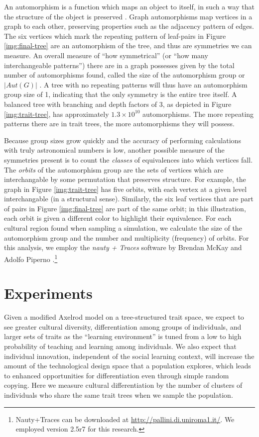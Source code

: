 An automorphism is a function which maps an object to itself, in such a
way that the structure of the object is preserved
\citep{rotman1995introduction}. Graph automorphisms map vertices in a
graph to each other, preserving properties such as the adjacency pattern
of edges. The six vertices which mark the repeating pattern of
leaf-pairs in Figure \ref{img:final-tree} are an automorphism of the
tree, and thus are symmetries we can measure. An overall measure of
``how symmetrical'' (or ``how many interchangeable patterns'') there are
in a graph possesses given by the total number of automorphisms found,
called the size of the automorphism group or $|\textit{Aut}(G)|$
\citep{godsil2001algebraic}. A tree with no repeating patterns will thus
have an automorphism group size of 1, indicating that the only symmetry
is the entire tree itself. A balanced tree with branching and depth
factors of 3, as depicted in Figure \ref{img:trait-tree}, has
approximately $1.3 \times 10^{10}$ automorphisms. The more repeating
patterns there are in trait trees, the more automorphisms they will
possess.

Because group sizes grow quickly and the accuracy of performing
calculations with truly astronomical numbers is low, another possible
measure of the symmetries present is to count the \emph{classes} of
equivalences into which vertices fall. The \emph{orbits} of the
automorphism group are the sets of vertices which are interchangable by
some permutation that preserves structure. For example, the graph in
Figure \ref{img:trait-tree} has five orbits, with each vertex at a given
level interchangable (in a structural sense). Similarly, the six leaf
vertices that are part of pairs in Figure \ref{img:final-tree} are part
of the same orbit; in this illustration, each orbit is given a different
color to highlight their equivalence. For each cultural region found
when sampling a simulation, we calculate the size of the automorphism
group and the number and multiplicity (frequency) of orbits. For this
analysis, we employ the \emph{nauty + Traces} software by Brendan McKay
and Adolfo Piperno \citep{McKay201494}.\footnote{Nauty+Traces can be
  downloaded at \url{http://pallini.di.uniroma1.it/}. We employed
  version 2.5r7 for this research.}

\section{Experiments}\label{experiments}

Given a modified Axelrod model on a tree-structured trait space, we
expect to see greater cultural diversity, differentiation among groups
of individuals, and larger sets of traits as the ``learning
environment'' is tuned from a low to high probability of teaching and
learning among individuals. We also expect that individual innovation,
independent of the social learning context, will increase the amount of
the technological design space that a population explores, which leads
to enhanced opportunities for differentiation even through simple random
copying. Here we measure cultural differentiation by the number of
clusters of individuals who share the same trait trees when we sample
the population.

